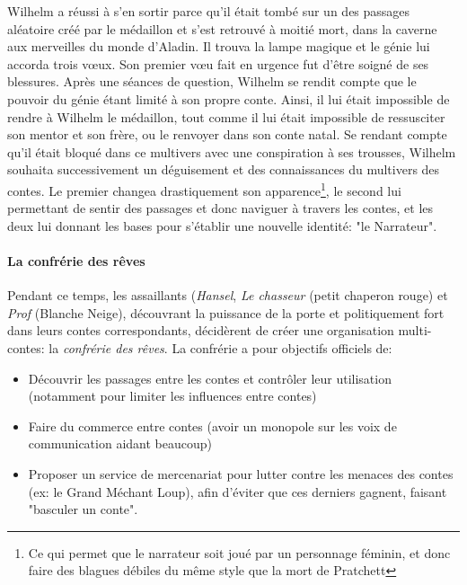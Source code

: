 {	\par Wilhelm a réussi à s'en sortir parce qu'il était tombé sur un des passages aléatoire créé par le médaillon et s'est retrouvé à moitié mort, dans la caverne aux merveilles du monde d'Aladin. Il trouva la lampe magique et le génie lui accorda trois vœux. Son premier vœu fait en urgence fut d'être soigné de ses blessures. Après une séances de question, Wilhelm se rendit compte que le pouvoir du génie étant limité à son propre conte. Ainsi, il lui était impossible de rendre à Wilhelm le médaillon, tout comme il lui était impossible de ressusciter son mentor et son frère, ou le renvoyer dans son conte natal. Se rendant compte qu'il était bloqué dans ce multivers avec une conspiration à ses trousses, Wilhelm souhaita successivement un déguisement et des connaissances du multivers des contes. Le premier changea drastiquement son apparence\footnote{Ce qui permet que le narrateur soit joué par un personnage féminin, et donc faire des blagues débiles du même style que la mort de Pratchett}, le second lui permettant de sentir des passages et donc naviguer à travers les contes, et les deux lui donnant les bases pour s'établir une nouvelle identité: "le Narrateur".
	
	
	\paragraph{La confrérie des rêves} Pendant ce temps, les assaillants (\emph{Hansel}, \emph{Le chasseur} (petit chaperon rouge) et \emph{Prof} (Blanche Neige), découvrant la puissance de la porte et politiquement fort dans leurs contes correspondants, décidèrent de créer une organisation multi-contes: la \emph{confrérie des rêves}. La confrérie a pour objectifs officiels de:
	\begin{itemize}
		\item Découvrir les passages entre les contes et contrôler leur utilisation (notamment pour limiter les influences entre contes)
		\item Faire du commerce entre contes (avoir un monopole sur les voix de communication aidant beaucoup)
		\item Proposer un service de mercenariat pour lutter contre les menaces des contes (ex: le Grand Méchant Loup), afin d'éviter que ces derniers gagnent, faisant "basculer un conte".
	\end{itemize}
	
}
